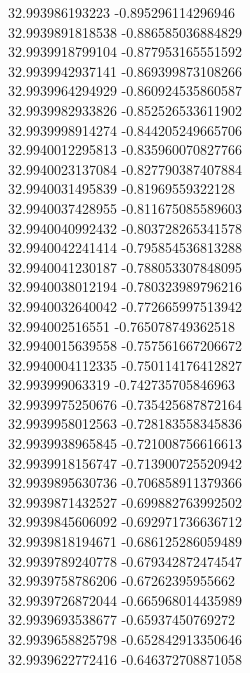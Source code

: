 {32.993986193223	-0.895296114296946\\
32.9939891818538	-0.886585036884829\\
32.9939918799104	-0.877953165551592\\
32.9939942937141	-0.869399873108266\\
32.9939964294929	-0.860924535860587\\
32.9939982933826	-0.852526533611902\\
32.9939998914274	-0.844205249665706\\
32.9940012295813	-0.835960070827766\\
32.9940023137084	-0.827790387407884\\
32.9940031495839	-0.81969559322128\\
32.9940037428955	-0.811675085589603\\
32.9940040992432	-0.803728265341578\\
32.9940042241414	-0.795854536813288\\
32.9940041230187	-0.788053307848095\\
32.9940038012194	-0.780323989796216\\
32.9940032640042	-0.772665997513942\\
32.994002516551	-0.765078749362518\\
32.9940015639558	-0.757561667206672\\
32.9940004112335	-0.750114176412827\\
32.993999063319	-0.742735705846963\\
32.9939975250676	-0.735425687872164\\
32.9939958012563	-0.728183558345836\\
32.9939938965845	-0.721008756616613\\
32.9939918156747	-0.713900725520942\\
32.9939895630736	-0.706858911379366\\
32.9939871432527	-0.699882763992502\\
32.9939845606092	-0.692971736636712\\
32.9939818194671	-0.686125286059489\\
32.9939789240778	-0.679342872474547\\
32.9939758786206	-0.67262395955662\\
32.9939726872044	-0.665968014435989\\
32.9939693538677	-0.65937450769272\\
32.9939658825798	-0.652842913350646\\
32.9939622772416	-0.646372708871058\\
}
